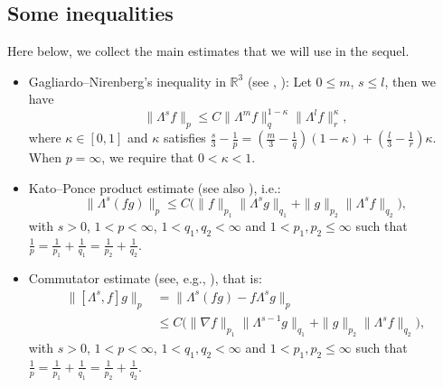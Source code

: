 \documentclass[a4paper]{article}
\begin{document}
  \subsection{Some inequalities} \label{subsec:utility-estimates}
  Here below, we collect the main estimates that we will use in the sequel.
  \begin{itemize}
  \item Gagliardo--Nirenberg's inequality in $\mathbb{R}^3$ (see
    \cite{Nirenberg-1959}, \cite{Zhao}):
\newline
    Let $0 \leq m$, $s \leq l$, then we have
%
  \begin{equation*}
    \label{e:GN-Hajaiej}
    \|\Lambda^s f\|_{p}\le C \|\Lambda^mf\|_{q}^{1-\kappa}\|\Lambda^{l}f\|_{r}^\kappa,
  \end{equation*}
  where $\kappa \in [0, 1]$ and $\kappa$ satisfies $
    \frac{s}{3}-\frac{1}{p}=\left(\frac{m}{3} -\frac{1}{q}\right)(1-\kappa)
    +\left(\frac{l}{3}-\frac{1}{r}\right) \kappa$.  When $p = \infty$, we require that $0 < \kappa < 1$.

\item
  Kato--Ponce product estimate
  \cite{Kato-Ponce-1988} {(see also \cite{G-2019, KPV1991})}, i.e.:
%
  \begin{equation}\label{KP}
    \|\Lambda^s(fg)\|_p \leq C\big(\|f\|_{p_1} \|\Lambda^s g\|_{q_1}
    + \|g\|_{p_2}\|\Lambda^s f\|_{q_2} \big),
  \end{equation}
  with $s>0$, $1<p<\infty$, $1< q_1, q_2< \infty$ and
  $1< p_1, p_2\leq \infty$ such that
  $\frac{1}{p} = \frac{1}{p_1} + \frac{1}{q_1} = \frac{1}{p_2} +
  \frac{1}{q_2}$.

\item
   Commutator estimate (see, e.g.,
  \cite{Kato-Ponce-1988, KPV1991}), that is:
%
  \begin{equation} \label{KPV}
    \begin{aligned}
      \|[\Lambda^s,f]g\|_p &= \|\Lambda^s(fg) - f\Lambda^s g\|_p \\
      &\leq C\big(\|\nabla f\|_{p_1} \|\Lambda^{s-1}g\|_{q_1} +
      \|g\|_{p_2}\|\Lambda^s f\|_{q_2} \big),
    \end{aligned}
  \end{equation}
  with $s>0$, $1<p<\infty$, $1< q_1, q_2< \infty$ and
  $1< p_1, p_2\leq \infty$ such that
  $\frac{1}{p} = \frac{1}{p_1} + \frac{1}{q_1} = \frac{1}{p_2} +
  \frac{1}{q_2}$.
  

\end{itemize}
\end{document}
